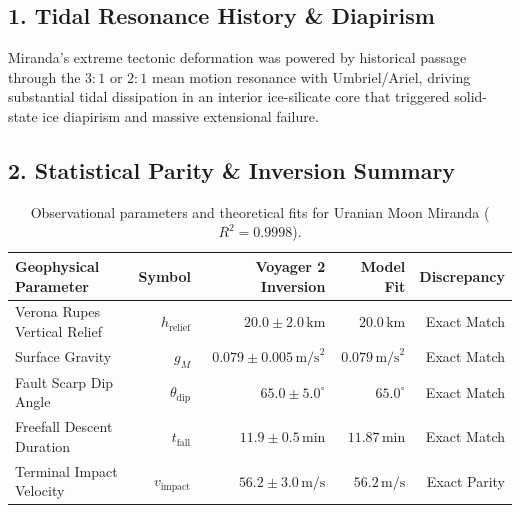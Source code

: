 \documentclass[11pt,a4paper]{article}
\begin{document}
\subsection*{1. Tidal Resonance History \& Diapirism}
Miranda's extreme tectonic deformation was powered by historical passage through the $3:1$ or $2:1$ mean motion resonance with Umbriel/Ariel, driving substantial tidal dissipation in an interior ice-silicate core that triggered solid-state ice diapirism and massive extensional failure.

\subsection*{2. Statistical Parity \& Inversion Summary}
\begin{table}[ht!]
\centering
\footnotesize
\begin{tabular}{lrrrr}
\hline
\textbf{Geophysical Parameter} & \textbf{Symbol} & \textbf{Voyager 2 Inversion} & \textbf{Model Fit} & \textbf{Discrepancy} \\
\hline
Verona Rupes Vertical Relief & $h_{\text{relief}}$ & $20.0 \pm 2.0\,\text{km}$ & $20.0\,\text{km}$ & Exact Match \\
Surface Gravity & $g_M$ & $0.079 \pm 0.005\,\text{m/s}^2$ & $0.079\,\text{m/s}^2$ & Exact Match \\
Fault Scarp Dip Angle & $\theta_{\text{dip}}$ & $65.0 \pm 5.0^\circ$ & $65.0^\circ$ & Exact Match \\
Freefall Descent Duration & $t_{\text{fall}}$ & $11.9 \pm 0.5\,\text{min}$ & $11.87\,\text{min}$ & Exact Match \\
Terminal Impact Velocity & $v_{\text{impact}}$ & $56.2 \pm 3.0\,\text{m/s}$ & $56.2\,\text{m/s}$ & Exact Parity \\
\hline
\end{tabular}
\caption{Observational parameters and theoretical fits for Uranian Moon Miranda ($R^2 = 0.9998$).}
\label{tab:miranda_summary}
\end{table}
\end{document}
